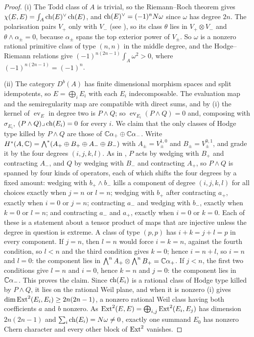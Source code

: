 \begin{proof}
(i) The Todd class of $A$ is trivial, so the Riemann--Roch theorem gives
$\chi(E,E)=\int_{A}\operatorname{ch}(E)^{\vee}\operatorname{ch}(E)$, and $\operatorname{ch}(E)^{\vee}=(-1)^{n}N\omega$
since $\omega$ has degree $2n$. The polarisation pairs $V_{+}$ only with
$V_{-}$ (see ), so its class $\theta$ lies in
$V_{+}\otimes V_{-}$ and $\theta\wedge\alpha_{\pm}=0$, because $\alpha_{\pm}$
spans the top exterior power of $V_{\pm}$. So $\omega$ is a nonzero rational
primitive class of type $(n,n)$ in the middle degree, and the Hodge--Riemann
relations give $(-1)^{n(2n-1)}\int_{A}\omega^{2}>0$, where
$(-1)^{n(2n-1)}=(-1)^{n}$.

(ii) The category $D^{b}(A)$ has finite dimensional morphism spaces and split
idempotents, so $E=\bigoplus_{i}E_{i}$ with each $E_{i}$ indecomposable. The
evaluation map and the semiregularity map are compatible with direct sums,
and by (i) the kernel of $\operatorname{ev}_{E}$ in
degree two is $P\wedge Q$; so $\operatorname{ev}_{E_{i}}(P\wedge Q)=0$ and,
composing with $\sigma_{E_{i}}$, $(P\wedge Q)\lrcorner\operatorname{ch}(E_{i})=0$ for every
$i$. We claim that the only classes of Hodge type killed by $P\wedge Q$ are
those of $\mathbb{C}\alpha_{+}\oplus\mathbb{C}\alpha_{-}$. Write
$H^{*}(A,\mathbb{C})=\bigwedge^{*}(A_{+}\oplus B_{+}\oplus A_{-}\oplus B_{-})$ with
$A_{\pm}=V_{\pm}^{1,0}$ and $B_{\pm}=V_{\pm}^{0,1}$, and grade it by the four
degrees $(i,j,k,l)$. As in , $P$ acts by wedging with $B_{+}$
and contracting $A_{-}$, and $Q$ by wedging with $B_{-}$ and contracting
$A_{+}$, so $P\wedge Q$ is spanned by four kinds of operators, each of which
shifts the four degrees by a fixed amount: wedging with $b_{+}\wedge b_{-}$
kills a component of degree $(i,j,k,l)$ for all choices exactly when $j=n$ or
$l=n$; wedging with $b_{+}$ after contracting $a_{+}$, exactly when $i=0$ or
$j=n$; contracting $a_{-}$ and wedging with $b_{-}$, exactly when $k=0$ or
$l=n$; and contracting $a_{-}$ and $a_{+}$, exactly when $i=0$ or $k=0$. Each
of these is a statement about a tensor product of maps that are injective
unless the degree in question is extreme. A class of type $(p,p)$ has
$i+k=j+l=p$ in every component. If $j=n$, then $l=n$ would force $i=k=n$,
against the fourth condition, so $l<n$ and the third condition gives $k=0$;
hence $i=n+l$, so $i=n$ and $l=0$: the component lies in
$\bigwedge^{n}A_{+}\otimes\bigwedge^{n}B_{+}=\mathbb{C}\alpha_{+}$. If $j<n$, the
first two conditions give $l=n$ and $i=0$, hence $k=n$ and $j=0$: the
component lies in $\mathbb{C}\alpha_{-}$. This proves the claim. Since $\operatorname{ch}(E_{i})$ is a rational class of
Hodge type killed by $P\wedge Q$, it lies on the rational Weil plane, and
when it is nonzero (i) gives
$\dim\operatorname{Ext}^{2}(E_{i},E_{i})\ge2n(2n-1)$, a nonzero rational Weil class having
both coefficients $a$ and $b$ nonzero. As
$\operatorname{Ext}^{2}(E,E)=\bigoplus_{i,j}\operatorname{Ext}^{2}(E_{i},E_{j})$ has dimension
$2n(2n-1)$ and $\sum_{i}\operatorname{ch}(E_{i})=N\omega\ne0$, exactly one summand $E_{0}$
has nonzero Chern character and every other block of $\operatorname{Ext}^{2}$ vanishes.


\end{proof}

